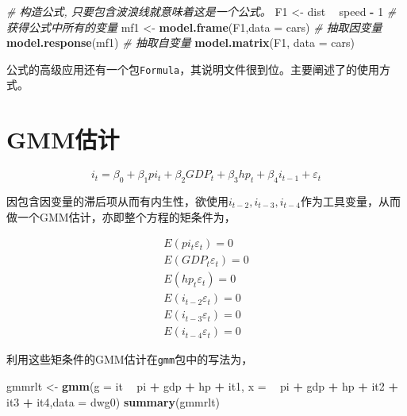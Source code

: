 \documentclass[
]{book}
\newenvironment{Shaded}{\begin{snugshade}}{\end{snugshade}}
\newcommand{\CommentTok}[1]{\textcolor[rgb]{0.56,0.35,0.01}{\textit{#1}}}
\newcommand{\DataTypeTok}[1]{\textcolor[rgb]{0.13,0.29,0.53}{#1}}
\newcommand{\DecValTok}[1]{\textcolor[rgb]{0.00,0.00,0.81}{#1}}
\newcommand{\KeywordTok}[1]{\textcolor[rgb]{0.13,0.29,0.53}{\textbf{#1}}}
\newcommand{\NormalTok}[1]{#1}
\newcommand{\OperatorTok}[1]{\textcolor[rgb]{0.81,0.36,0.00}{\textbf{#1}}}
\newcommand{\StringTok}[1]{\textcolor[rgb]{0.31,0.60,0.02}{#1}}
\begin{document}
\begin{Shaded}
\begin{Highlighting}[]
\CommentTok{# 构造公式, 只要包含波浪线就意味着这是一个公式。}
\NormalTok{F1 <-}\StringTok{ }\NormalTok{dist }\OperatorTok{~}\StringTok{ }\NormalTok{speed }\OperatorTok{-}\StringTok{ }\DecValTok{1}
\CommentTok{# 获得公式中所有的变量}
\NormalTok{mf1 <-}\StringTok{ }\KeywordTok{model.frame}\NormalTok{(F1,}\DataTypeTok{data =}\NormalTok{ cars)}
\CommentTok{# 抽取因变量}
\KeywordTok{model.response}\NormalTok{(mf1)}
\CommentTok{# 抽取自变量}
\KeywordTok{model.matrix}\NormalTok{(F1, }\DataTypeTok{data =}\NormalTok{ cars)}
\end{Highlighting}
\end{Shaded}

公式的高级应用还有一个包\texttt{Formula}，其说明文件很到位。主要阐述了\texttt{\textbar{}}的使用方式。

\hypertarget{gmmux4f30ux8ba1}{%
\section{GMM估计}\label{gmmux4f30ux8ba1}}

\[
i _t =\beta_0 + \beta_1pi_t + \beta_2GDP_t + \beta_3hp_t + \beta_4i_{t-1} + \varepsilon_t
\]

因包含因变量的滞后项从而有内生性，欲使用\(i_{t-2},i_{t-3},i_{t-4}\)作为工具变量，从而做一个GMM估计，亦即整个方程的矩条件为，

\begin{align}
E(pi_t\varepsilon_t) = 0\\

E(GDP_t\varepsilon_t) = 0\\

E(hp_t\varepsilon_t) = 0\\

E(i_{t-2}\varepsilon_t) = 0\\

E(i_{t-3}\varepsilon_t) = 0\\

E(i_{t-4}\varepsilon_t) = 0
\end{align}

利用这些矩条件的GMM估计在\texttt{gmm}包中的写法为，

\begin{Shaded}
\begin{Highlighting}[]
\NormalTok{gmmrlt <-}\StringTok{ }\KeywordTok{gmm}\NormalTok{(}\DataTypeTok{g =}\NormalTok{ it }\OperatorTok{~}\StringTok{ }\NormalTok{pi }\OperatorTok{+}\StringTok{ }\NormalTok{gdp }\OperatorTok{+}\StringTok{ }\NormalTok{hp }\OperatorTok{+}\StringTok{ }\NormalTok{it1, }\DataTypeTok{x =} \OperatorTok{~}\StringTok{ }\NormalTok{pi }\OperatorTok{+}\StringTok{ }\NormalTok{gdp }\OperatorTok{+}\StringTok{ }\NormalTok{hp }\OperatorTok{+}\StringTok{ }\NormalTok{it2 }\OperatorTok{+}\StringTok{ }\NormalTok{it3 }\OperatorTok{+}\StringTok{ }\NormalTok{it4,}\DataTypeTok{data =}\NormalTok{ dwg0)}
\KeywordTok{summary}\NormalTok{(gmmrlt)}
\end{Highlighting}
\end{Shaded}
\end{document}
